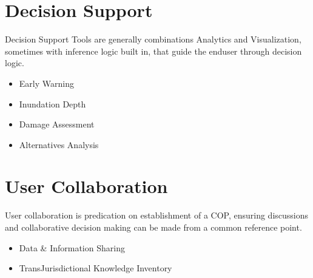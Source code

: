 \documentclass[letterpaper,12pt,english]{sphinxmanual}
\begin{document}
\section{Decision Support}
\label{\detokenize{requirements/wisdom/dss:decision-support}}\label{\detokenize{requirements/wisdom/dss::doc}}
\sphinxAtStartPar
Decision Support Tools are generally combinations Analytics and Visualization,
sometimes with inference logic built in, that guide the end\sphinxhyphen{}user through
decision logic.
\begin{itemize}
\item {} 
\sphinxAtStartPar
Early Warning

\item {} 
\sphinxAtStartPar
Inundation Depth

\item {} 
\sphinxAtStartPar
Damage Assessment

\item {} 
\sphinxAtStartPar
Alternatives Analysis

\end{itemize}


\section{User Collaboration}
\label{\detokenize{requirements/wisdom/collaboration:user-collaboration}}\label{\detokenize{requirements/wisdom/collaboration::doc}}
\sphinxAtStartPar
User collaboration is predication on establishment of a COP, ensuring
discussions and collaborative decision making can be made from a common
reference point.
\begin{itemize}
\item {} 
\sphinxAtStartPar
Data \& Information Sharing

\item {} 
\sphinxAtStartPar
Trans\sphinxhyphen{}Jurisdictional Knowledge Inventory

\end{itemize}
\end{document}
